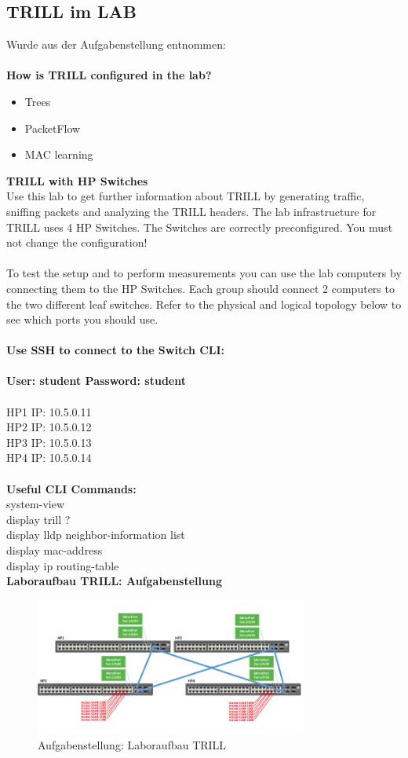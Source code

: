 \documentclass[a4,12pt]{scrartcl}
\begin{document}
\subsection{TRILL im LAB}
Wurde aus der Aufgabenstellung entnommen: \\
\\
\textbf{How is TRILL configured in the lab?}
\begin{itemize}
\item Trees
\item PacketFlow
\item MAC learning
\end{itemize}

\noindent \textbf{TRILL with HP Switches}\\
Use this lab to get further information about TRILL by generating traffic, sniffing packets and analyzing the TRILL headers. The lab infrastructure for TRILL uses 4 HP Switches. The Switches are correctly preconfigured. You must not change the configuration!\\ 
\\
To test the setup and to perform measurements you can use the lab computers by connecting them to the HP Switches. Each group should connect 2 computers to the two different leaf switches. Refer to the physical and logical topology below to see which ports you should use.\\
\\
\textbf{Use SSH to connect to the Switch CLI:}\\
\\
\textbf{User: student Password: student}\\
\\
HP1 IP: 10.5.0.11\\
HP2 IP: 10.5.0.12\\
HP3 IP: 10.5.0.13\\
HP4 IP: 10.5.0.14\\
\\
\textbf{Useful CLI Commands:}\\
system-view\\
display trill ?\\
display lldp neighbor-information list\\
display mac-address\\
display ip routing-table\\
\newpage
\textbf{Laboraufbau TRILL: Aufgabenstellung}
\begin{figure} [H]
	\begin{center}
	\includegraphics[width=0.80\textwidth]{./pictures/trill_laboraufbau.png}
	\caption{Aufgabenstellung: Laboraufbau TRILL}
	\label{x}
	\end{center}
\end{figure}
\end{document}
